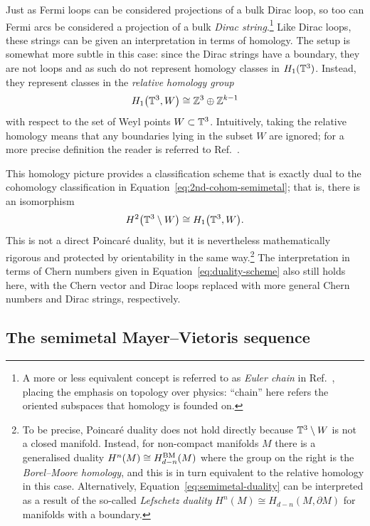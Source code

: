 Just as Fermi loops can be considered projections of a bulk Dirac loop, so too can Fermi arcs be considered a projection of a bulk \emph{Dirac string}.\footnote{
	A more or less equivalent concept is referred to as \emph{Euler chain} in Ref.~\cite{Mathai_math-review}, placing the emphasis on topology over physics: ``chain'' here refers the oriented subspaces that homology is founded on.}
Like Dirac loops, these strings can be given an interpretation in terms of homology. The setup is somewhat more subtle in this case: since the Dirac strings have a boundary, they are not loops and as such do not represent homology classes in $H_1(\mathbb{T}^3)$. Instead, they represent classes in the \emph{relative homology group}
\begin{equation}\label{eq:relative-homology}
	H_1\big(\mathbb{T}^3, W\big) \cong \mathbb{Z}^3\oplus\mathbb{Z}^{k-1}
\end{equation}
with respect to the set of Weyl points $W\subset\mathbb{T}^3$. Intuitively, taking the relative homology means that any boundaries lying in the subset $W$ are ignored; for a more precise definition the reader is referred to Ref.~\parencite[\S 2.1]{Hatcher_algebraic-topology}.

This homology picture provides a classification scheme that is exactly dual to the cohomology classification in Equation~\eqref{eq:2nd-cohom-semimetal}; that is, there is an isomorphism
\begin{equation}\label{eq:semimetal-duality}
	H^2\big(\mathbb{T}^3\setminus W\big) \cong H_1\big(\mathbb{T}^3, W\big).
\end{equation}
This is not a direct Poincar\'e duality, but it is nevertheless mathematically rigorous and protected by orientability in the same way.\footnote{
	To be precise, Poincar\'e duality does not hold directly because $\mathbb{T}^3\setminus W$ is not a closed manifold. Instead, for non-compact manifolds $M$ there is a generalised duality $H^n(M)\cong H_{d-n}^{\rm BM}(M)$ where the group on the right is the \emph{Borel--Moore homology}, and this is in turn equivalent to the relative homology in this case. Alternatively, Equation~\eqref{eq:semimetal-duality} can be interpreted as a result of the so-called \emph{Lefschetz duality} $H^n(M)\cong H_{d-n}(M, \partial M)$ for manifolds with a boundary.}
The interpretation in terms of Chern numbers given in Equation~\eqref{eq:duality-scheme} also still holds here, with the Chern vector and Dirac loops replaced with more general Chern numbers and Dirac strings, respectively.


\subsection{The semimetal Mayer--Vietoris sequence}\label{sec:Mayer-Vietoris}

